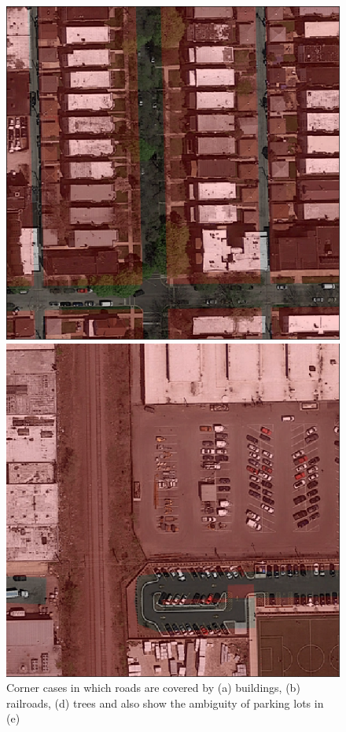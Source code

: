 \documentclass[10pt,conference,compsocconf]{IEEEtran}
\begin{document}
\begin{figure}
\begin{minipage}{0.2\textwidth}
	\end{minipage}
	\begin{minipage}{0.2\textwidth}
		\centering
		\includegraphics[width=1\textwidth]{img/trees.png}
	\end{minipage}
	\begin{minipage}{0.2\textwidth}
		\centering
		\includegraphics[width=1\textwidth]{img/parkinglot.png}
	\end{minipage}
	\caption{Corner cases in which roads are covered by (a) buildings, (b) railroads, (d) trees and also show the ambiguity of parking lots in (e)}
	\label{fig:corner-cases}
\end{figure}
\end{document}
